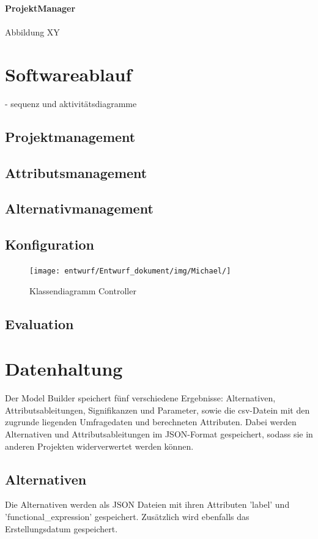 \documentclass{article}
\begin{document}
\newpage
\textbf{\large{ProjektManager}}\\\\
Abbildung XY






\section{Softwareablauf}
- sequenz und aktivitätsdiagramme
\subsection{Projektmanagement}
\subsection{Attributsmanagement}
\subsection{Alternativmanagement}
\subsection{Konfiguration}

\begin{figure}[H]%
    \centering
    \texttt{[image: entwurf/Entwurf\_dokument/img/Michael/]}
    \caption{Klassendiagramm Controller}
\end{figure}

\subsection{Evaluation}


\section{Datenhaltung}

Der Model Builder speichert fünf verschiedene Ergebnisse: Alternativen, Attributsableitungen, Signifikanzen und Parameter, sowie die csv-Datein mit den zugrunde liegenden Umfragedaten und berechneten Attributen. Dabei werden Alternativen und Attributsableitungen im JSON-Format gespeichert, sodass sie in anderen Projekten widerverwertet werden können.

\subsection{Alternativen}
Die Alternativen werden als JSON Dateien mit ihren Attributen 'label' und 'functional\_expression' gespeichert. Zusätzlich wird ebenfalls das Erstellungsdatum gespeichert.
\end{document}
